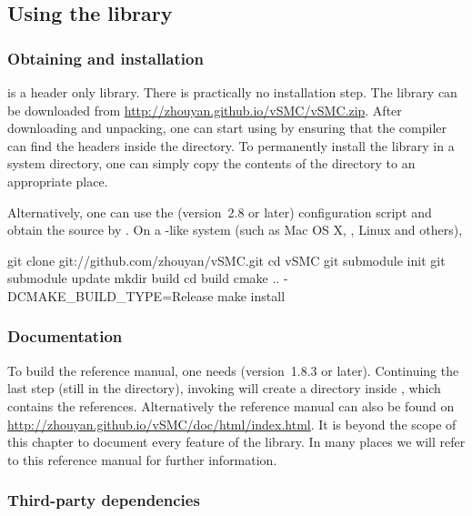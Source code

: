 \subsection{Using the library}
\label{sub:Using the library}

\subsubsection{Obtaining and installation}
\label{ssub:Obtaining and installation}

\vsmc is a header only library. There is practically no installation step. The
library can be downloaded from \url{http://zhouyan.github.io/vSMC/vSMC.zip}.
After downloading and unpacking, one can start using \vsmc by ensuring that
the compiler can find the headers inside the  directory. To
permanently install the library in a system directory, one can simply copy the
contents of the  directory to an appropriate place.

Alternatively, one can use the \cmake \cite{cmake} (version~2.8 or later)
configuration script and obtain the source by \git \cite{git}. On a \unix-like
system (such as Mac OS X, \bsd, Linux and others),
\begin{shcode}
git clone git://github.com/zhouyan/vSMC.git
cd vSMC
git submodule init
git submodule update
mkdir build
cd build
cmake .. -DCMAKE_BUILD_TYPE=Release
make install
\end{shcode}

\subsubsection{Documentation}
\label{ssub:Documentation}

To build the reference manual, one needs \doxygen \cite{doxygen}
(version~1.8.3 or later).  Continuing the last step (still in the
 directory), invoking  will create a
 directory inside , which contains the \html
references. Alternatively the reference manual can also be found on
\url{http://zhouyan.github.io/vSMC/doc/html/index.html}. It is beyond the
scope of this chapter to document every feature of the \vsmc library. In many
places we will refer to this reference manual for further information.

\subsubsection{Third-party dependencies}
\label{ssub:Third-party dependencies}

